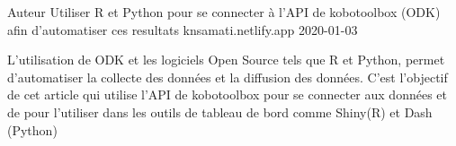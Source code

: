 \begin{cventries}
 \cventry
    {Auteur} %
    {Utiliser R et Python pour se connecter à l'API de kobotoolbox (ODK) afin d'automatiser ces resultats} %
    {knsamati.netlify.app} %
    {2020-01-03} %
    {
      \begin{cvitems} %
        \item {L'utilisation de ODK et les logiciels Open Source tels que R et Python, permet d'automatiser la collecte des données et la diffusion des données. C'est l'objectif de cet article qui utilise l'API de kobotoolbox pour se connecter aux données et de pour l'utiliser dans les outils de tableau de bord comme Shiny(R) et Dash (Python)}
      \end{cvitems}
    }

\end{cventries}
